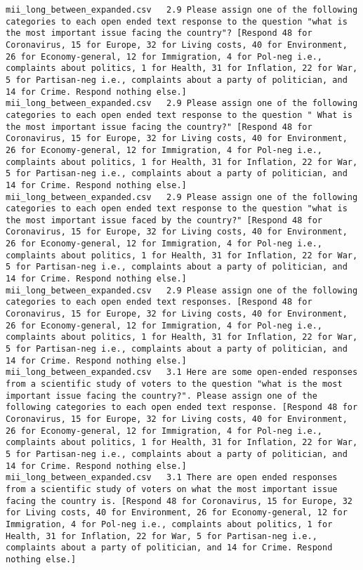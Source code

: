 \begin{lstlisting}[label=lst:promptvariants]
mii_long_between_expanded.csv	2.9	Please assign one of the following categories to each open ended text response to the question "what is the most important issue facing the country"? [Respond 48 for Coronavirus, 15 for Europe, 32 for Living costs, 40 for Environment, 26 for Economy-general, 12 for Immigration, 4 for Pol-neg i.e., complaints about politics, 1 for Health, 31 for Inflation, 22 for War, 5 for Partisan-neg i.e., complaints about a party of politician, and 14 for Crime. Respond nothing else.]
mii_long_between_expanded.csv	2.9	Please assign one of the following categories to each open ended text response to the question " What is the most important issue facing the country?" [Respond 48 for Coronavirus, 15 for Europe, 32 for Living costs, 40 for Environment, 26 for Economy-general, 12 for Immigration, 4 for Pol-neg i.e., complaints about politics, 1 for Health, 31 for Inflation, 22 for War, 5 for Partisan-neg i.e., complaints about a party of politician, and 14 for Crime. Respond nothing else.]
mii_long_between_expanded.csv	2.9	Please assign one of the following categories to each open ended text response to the question "what is the most important issue faced by the country?" [Respond 48 for Coronavirus, 15 for Europe, 32 for Living costs, 40 for Environment, 26 for Economy-general, 12 for Immigration, 4 for Pol-neg i.e., complaints about politics, 1 for Health, 31 for Inflation, 22 for War, 5 for Partisan-neg i.e., complaints about a party of politician, and 14 for Crime. Respond nothing else.]
mii_long_between_expanded.csv	2.9	Please assign one of the following categories to each open ended text responses. [Respond 48 for Coronavirus, 15 for Europe, 32 for Living costs, 40 for Environment, 26 for Economy-general, 12 for Immigration, 4 for Pol-neg i.e., complaints about politics, 1 for Health, 31 for Inflation, 22 for War, 5 for Partisan-neg i.e., complaints about a party of politician, and 14 for Crime. Respond nothing else.]
mii_long_between_expanded.csv	3.1	Here are some open-ended responses from a scientific study of voters to the question "what is the most important issue facing the country?". Please assign one of the following categories to each open ended text response. [Respond 48 for Coronavirus, 15 for Europe, 32 for Living costs, 40 for Environment, 26 for Economy-general, 12 for Immigration, 4 for Pol-neg i.e., complaints about politics, 1 for Health, 31 for Inflation, 22 for War, 5 for Partisan-neg i.e., complaints about a party of politician, and 14 for Crime. Respond nothing else.]
mii_long_between_expanded.csv	3.1	There are open ended responses from a scientific study of voters on what the most important issue facing the country is. [Respond 48 for Coronavirus, 15 for Europe, 32 for Living costs, 40 for Environment, 26 for Economy-general, 12 for Immigration, 4 for Pol-neg i.e., complaints about politics, 1 for Health, 31 for Inflation, 22 for War, 5 for Partisan-neg i.e., complaints about a party of politician, and 14 for Crime. Respond nothing else.]

\end{lstlisting}
